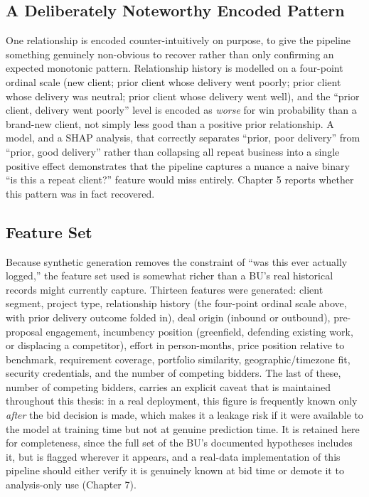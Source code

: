 \documentclass[12pt,oneside]{report}
\begin{document}
\hypertarget{a-deliberately-noteworthy-encoded-pattern}{%
\subsection{A Deliberately Noteworthy Encoded
Pattern}\label{a-deliberately-noteworthy-encoded-pattern}}

One relationship is encoded counter-intuitively on purpose, to give the
pipeline something genuinely non-obvious to recover rather than only
confirming an expected monotonic pattern. Relationship history is
modelled on a four-point ordinal scale (new client; prior client whose
delivery went poorly; prior client whose delivery was neutral; prior
client whose delivery went well), and the ``prior client, delivery went
poorly'' level is encoded as \emph{worse} for win probability than a
brand-new client, not simply less good than a positive prior
relationship. A model, and a SHAP analysis, that correctly separates
``prior, poor delivery'' from ``prior, good delivery'' rather than
collapsing all repeat business into a single positive effect
demonstrates that the pipeline captures a nuance a naive binary ``is
this a repeat client?'' feature would miss entirely. Chapter 5 reports
whether this pattern was in fact recovered.

\hypertarget{feature-set}{%
\subsection{Feature Set}\label{feature-set}}

Because synthetic generation removes the constraint of ``was this ever
actually logged,'' the feature set used is somewhat richer than a BU's
real historical records might currently capture. Thirteen features were
generated: client segment, project type, relationship history (the
four-point ordinal scale above, with prior delivery outcome folded in),
deal origin (inbound or outbound), pre-proposal engagement, incumbency
position (greenfield, defending existing work, or displacing a
competitor), effort in person-months, price position relative to
benchmark, requirement coverage, portfolio similarity,
geographic/timezone fit, security credentials, and the number of
competing bidders. The last of these, number of competing bidders,
carries an explicit caveat that is maintained throughout this thesis: in
a real deployment, this figure is frequently known only \emph{after} the
bid decision is made, which makes it a leakage risk if it were available
to the model at training time but not at genuine prediction time. It is
retained here for completeness, since the full set of the BU's
documented hypotheses includes it, but is flagged wherever it appears,
and a real-data implementation of this pipeline should either verify it
is genuinely known at bid time or demote it to analysis-only use
(Chapter 7).
\end{document}
